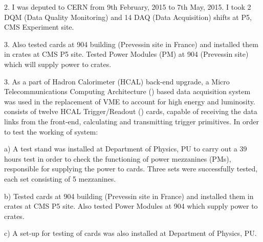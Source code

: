 2. I was deputed to CERN from 9th February, 2015 to 7th May, 2015. I took 2 DQM (Data Quality Monitoring) and 14 DAQ (Data Acquisition) shifts at P5, CMS Experiment site.

3. Also tested \mhtr cards at 904 building (Prevessin site in France) and installed them in \mtca crates at CMS P5 site. Tested Power Modules (PM) at 904 (Prevessin site) which will supply power to \mtca crates.

3. As a part of Hadron Calorimeter (HCAL) back-end upgrade, a Micro Telecommunications Computing Architecture (\mtca) based data acquisition system was used in the replacement of VME to account for high energy and luminosity. \mtca consists of twelve HCAL Trigger/Readout (\mhtr) cards, capable of receiving the data links from the front-end, calculating and transmitting trigger primitives. In order to test the working of \mtca system:

a) A test stand was installed at Department of Physics, PU to carry out a 39 hours test in order to check the functioning of power mezzanines (PMs), responsible for supplying the power to \mhtr cards. Three sets were successfully tested, each set consisting of 5 mezzanines.

b) Tested \mhtr cards at 904 building (Prevessin site in France) and installed them in \mtca crates at CMS P5 site. Also tested Power Modules at 904 which supply power to \mtca crates.

c) A set-up for testing of \mhtr cards was also installed at Department of Physics, PU.


